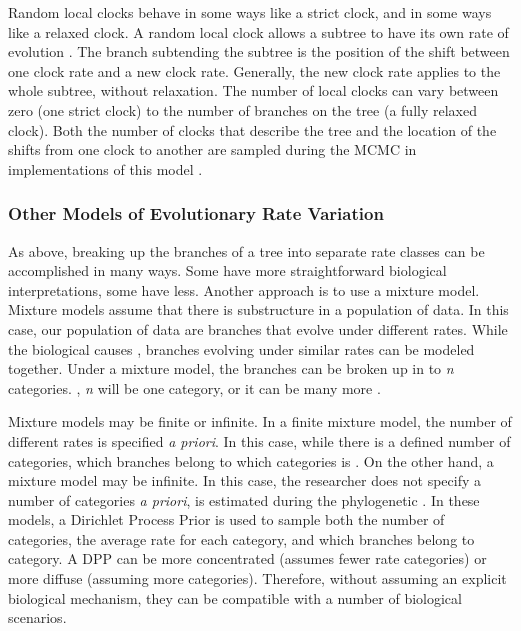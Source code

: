 Random local clocks behave in some ways like a strict clock, and in some ways like a relaxed clock.
A random local clock allows a subtree to have its own rate of evolution \citep{yoder2000}.
The branch subtending the subtree is the position of the shift between one clock rate and a new clock rate.
Generally, the new clock rate applies to the whole subtree, without relaxation.
The number of local clocks can vary between zero (one strict clock) to the number of branches on the tree (a fully relaxed clock).
Both the number of clocks that describe the tree and the location of the shifts from one clock to another are sampled during the MCMC in implementations of this model \citep{Drummond2010}.



\subsubsection{Other Models of Evolutionary Rate Variation}

As  above, breaking up the branches of a tree into separate rate classes can be accomplished in many ways.
Some have more straightforward biological interpretations, some have less.
Another approach is to use a mixture model.
Mixture models assume that there is substructure in a population of data.
In this case, our population of data are branches that evolve under different rates.
While the biological causes , branches evolving under similar rates can be modeled together.
Under a mixture model, the branches can be broken up in to \textit{n} categories.
, \textit{n} will be one category, or it can be many more .

Mixture models may be finite or infinite.
In a finite mixture model, the number of different rates is specified \textit{a priori}.
In this case, while there is a defined number of categories, which branches belong to which categories is .
On the other hand, a mixture model may be infinite.
In this case, the researcher does not specify a number of categories \textit{a priori},  is estimated during the phylogenetic  \citep{Heath2012a}.
In these models, a Dirichlet Process Prior  is used to sample both the number of categories, the average rate for each category, and which branches belong to  category.
A DPP can be more concentrated (assumes fewer rate categories) or more diffuse (assuming more categories).
Therefore, without assuming an explicit biological mechanism, they can be compatible with a number of biological scenarios.

